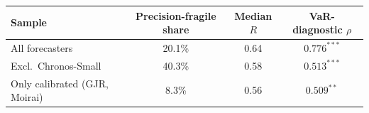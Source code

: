 \begin{tabular}{lccc}
\toprule
Sample & Precision-fragile share & Median $R$ & VaR-diagnostic $\rho$ \\
\midrule
  All forecasters & 20.1\% & 0.64 & $0.776^{***}$ \\
  Excl.\ Chronos-Small & 40.3\% & 0.58 & $0.513^{***}$ \\
  Only calibrated (GJR, Moirai) & 8.3\% & 0.56 & $0.509^{**}$ \\
\bottomrule
\end{tabular}
